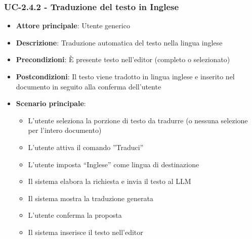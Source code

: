 \documentclass[11pt,a4paper]{article}
\begin{document}
\subsubsection{UC-2.4.2 - Traduzione del testo in Inglese}
\begin{itemize}
    \item \textbf{Attore principale}: Utente generico
    \item \textbf{Descrizione}: Traduzione automatica del testo nella lingua inglese
    \item \textbf{Precondizioni}: È presente testo nell’editor (completo o selezionato)
    \item \textbf{Postcondizioni}: Il testo viene tradotto in lingua inglese e inserito nel documento in seguito alla conferma dell'utente
    \item \textbf{Scenario principale}:
    \begin{itemize}
        \item L’utente seleziona la porzione di testo da tradurre (o nessuna selezione per l'intero documento)
        \item L’utente attiva il comando ”Traduci”
        \item L’utente imposta “Inglese” come lingua di destinazione
        \item Il sistema elabora la richiesta e invia il testo al LLM
        \item Il sistema mostra la traduzione generata
        \item L'utente conferma la proposta
        \item Il sistema inserisce il testo nell'editor
    \end{itemize}
\end{itemize}
\end{document}
